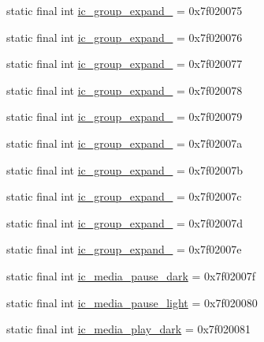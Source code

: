 \begin{CompactItemize}
\item 
static final int \hyperlink{classandroid_1_1support_1_1v4_1_1_r_1_1drawable_4a53f9cb78a1b502eb6630e7deda93a6}{ic\_\-group\_\-expand\_} = 0x7f020075
\item 
static final int \hyperlink{classandroid_1_1support_1_1v4_1_1_r_1_1drawable_96becdb7e10e82020603d44240f5c348}{ic\_\-group\_\-expand\_} = 0x7f020076
\item 
static final int \hyperlink{classandroid_1_1support_1_1v4_1_1_r_1_1drawable_d650e16ab8ec7eb9203000c3ec78841f}{ic\_\-group\_\-expand\_} = 0x7f020077
\item 
static final int \hyperlink{classandroid_1_1support_1_1v4_1_1_r_1_1drawable_6b4ed4d756dbf797b12f0895645e3063}{ic\_\-group\_\-expand\_} = 0x7f020078
\item 
static final int \hyperlink{classandroid_1_1support_1_1v4_1_1_r_1_1drawable_e6253cf4176b2126c5c976763eb8b206}{ic\_\-group\_\-expand\_} = 0x7f020079
\item 
static final int \hyperlink{classandroid_1_1support_1_1v4_1_1_r_1_1drawable_09549bb2467aaf894bb409beaf3546b9}{ic\_\-group\_\-expand\_} = 0x7f02007a
\item 
static final int \hyperlink{classandroid_1_1support_1_1v4_1_1_r_1_1drawable_c4d048fd9f88b86e0f479ff1e17da2d3}{ic\_\-group\_\-expand\_} = 0x7f02007b
\item 
static final int \hyperlink{classandroid_1_1support_1_1v4_1_1_r_1_1drawable_eed30d0124abaf4e539b727c26074162}{ic\_\-group\_\-expand\_} = 0x7f02007c
\item 
static final int \hyperlink{classandroid_1_1support_1_1v4_1_1_r_1_1drawable_8df653432a5063d7d394cbfeb0efaa50}{ic\_\-group\_\-expand\_} = 0x7f02007d
\item 
static final int \hyperlink{classandroid_1_1support_1_1v4_1_1_r_1_1drawable_83fee2dfbb737172df882e5f9e77bb39}{ic\_\-group\_\-expand\_} = 0x7f02007e
\item 
static final int \hyperlink{classandroid_1_1support_1_1v4_1_1_r_1_1drawable_dcab614e3dd7b43ee798a31838902948}{ic\_\-media\_\-pause\_\-dark} = 0x7f02007f
\item 
static final int \hyperlink{classandroid_1_1support_1_1v4_1_1_r_1_1drawable_8b442c77216bd8bc4e72305ab1cd69bc}{ic\_\-media\_\-pause\_\-light} = 0x7f020080
\item 
static final int \hyperlink{classandroid_1_1support_1_1v4_1_1_r_1_1drawable_e14de5a665726d0815186213ee65c52b}{ic\_\-media\_\-play\_\-dark} = 0x7f020081
\item 

\end{CompactItemize}
